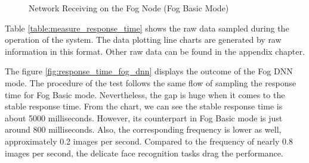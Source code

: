 \begin{figure}
\centering
{}
\caption{Network Receiving on the Fog Node  (Fog Basic Mode)}
\label{fig:network_receiving_fog_basic}
\end{figure}

Table \ref{table:measure_response_time} shows the raw data sampled during the operation of the system. The data plotting line charts are generated by raw information in this format. Other raw data can be found in the appendix chapter.

The figure \ref{fig:response_time_fog_dnn} displays the outcome of the Fog DNN mode. The procedure of the test follows the same flow of sampling the response time for Fog Basic mode. Nevertheless, the gap is huge when it comes to the stable response time. From the chart, we can see the stable response time is about 5000 milliseconds. However, its counterpart in Fog Basic mode is just around 800 milliseconds. Also, the corresponding frequency is lower as well, approximately 0.2 images per second. Compared to the frequency of nearly 0.8 images per second, the delicate face recognition tasks drag the performance.

